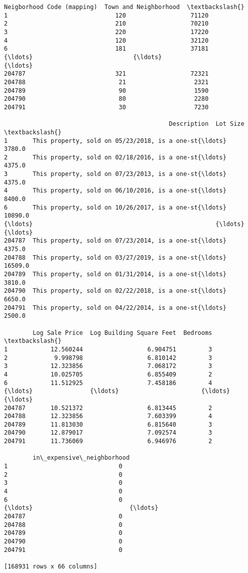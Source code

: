 \documentclass[11pt]{article}
\begin{document}
\begin{tcolorbox}[breakable, size=fbox, boxrule=.5pt, pad at break*=1mm, opacityfill=0]
\begin{Verbatim}[commandchars=\\\{\}]
        Neigborhood Code (mapping)  Town and Neighborhood  \textbackslash{}
1                              120                  71120
2                              210                  70210
3                              220                  17220
4                              120                  32120
6                              181                  37181
{\ldots}                            {\ldots}                    {\ldots}
204787                         321                  72321
204788                          21                   2321
204789                          90                   1590
204790                          80                   2280
204791                          30                   7230

                                              Description  Lot Size  \textbackslash{}
1       This property, sold on 05/23/2018, is a one-st{\ldots}    3780.0
2       This property, sold on 02/18/2016, is a one-st{\ldots}    4375.0
3       This property, sold on 07/23/2013, is a one-st{\ldots}    4375.0
4       This property, sold on 06/10/2016, is a one-st{\ldots}    8400.0
6       This property, sold on 10/26/2017, is a one-st{\ldots}   10890.0
{\ldots}                                                   {\ldots}       {\ldots}
204787  This property, sold on 07/23/2014, is a one-st{\ldots}    4375.0
204788  This property, sold on 03/27/2019, is a one-st{\ldots}   16509.0
204789  This property, sold on 01/31/2014, is a one-st{\ldots}    3810.0
204790  This property, sold on 02/22/2018, is a one-st{\ldots}    6650.0
204791  This property, sold on 04/22/2014, is a one-st{\ldots}    2500.0

        Log Sale Price  Log Building Square Feet  Bedrooms  \textbackslash{}
1            12.560244                  6.904751         3
2             9.998798                  6.810142         3
3            12.323856                  7.068172         3
4            10.025705                  6.855409         2
6            11.512925                  7.458186         4
{\ldots}                {\ldots}                       {\ldots}       {\ldots}
204787       10.521372                  6.813445         2
204788       12.323856                  7.603399         4
204789       11.813030                  6.815640         3
204790       12.879017                  7.092574         3
204791       11.736069                  6.946976         2

        in\_expensive\_neighborhood
1                               0
2                               0
3                               0
4                               0
6                               0
{\ldots}                           {\ldots}
204787                          0
204788                          0
204789                          0
204790                          0
204791                          0

[168931 rows x 66 columns]
\end{Verbatim}
\end{tcolorbox}
        
\end{document}
